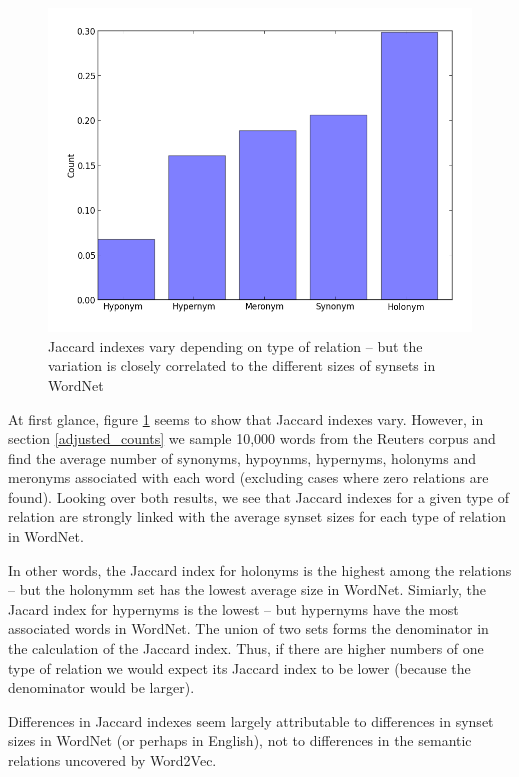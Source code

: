 \documentclass[titlepage]{article}
\begin{document}
\begin{figure}[!ht]
\centering
\centerline{\includegraphics[scale=.5]{jacard.png}}
  \captionsetup{justification=centering, margin=4cm }
  \caption{Jaccard indexes vary depending on type of relation -- but the variation is closely correlated to the different sizes of synsets in WordNet}
  \label{fig:jacard}
\end{figure}

At first glance, figure \ref{fig:jacard} seems to show that Jaccard indexes vary. However, in section \ref{adjusted_counts} we sample 10,000 words from the Reuters corpus and find the average number of synonyms, hypoynms, hypernyms, holonyms and meronyms associated with each word (excluding cases where zero relations are found). Looking over both results, we see that Jaccard indexes for a given type of relation are strongly linked with the average synset sizes for each type of relation in WordNet.

In other words, the Jaccard index for holonyms is the highest among the relations -- but the holonymm set has the lowest average size in WordNet. Simiarly, the Jacard index for hypernyms is the lowest -- but hypernyms have the most associated words in WordNet. The union of two sets forms the denominator in the calculation of the Jaccard index. Thus, if there are higher numbers of one type of relation we would expect its Jaccard index to be lower (because the denominator would be larger). 

Differences in Jaccard indexes seem largely attributable to differences in synset sizes in WordNet (or perhaps in English), not to differences in the semantic relations uncovered by Word2Vec. 
\end{document}
